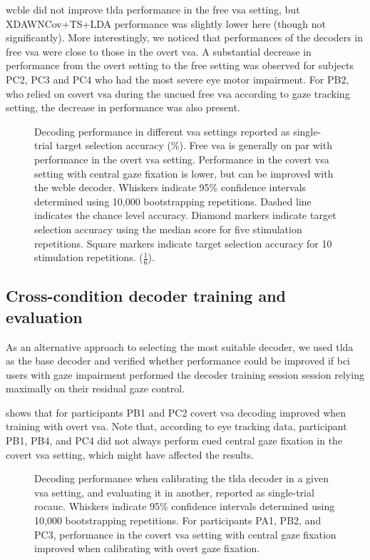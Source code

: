 \documentclass[twocolumn]{article}
\begin{document}
\Ac{wcble} did not improve \ac{tlda} performance in the free \ac{vsa} setting, but
XDAWNCov+TS+LDA performance was slightly lower here (though not
significantly).
More interestingly, we noticed that performances of the decoders in free
\ac{vsa} were close to those in the overt \ac{vsa}.
A substantial decrease in performance from the overt setting to the free
setting was observed for subjects PC2, PC3 and PC4 who had the most severe eye
motor impairment.
For PB2, who relied on covert \ac{vsa} during the uncued free \ac{vsa}
according to gaze tracking setting, the decrease in performance was also
present.
\begin{figure}[t]
	
	\caption{%
		Decoding performance in different \ac{vsa} settings reported as
		single-trial target selection accuracy (\%).
		Free \ac{vsa} is generally on par with performance in the overt \ac{vsa}
		setting.
		Performance in the covert \ac{vsa} setting with central gaze fixation is lower, but can
		be improved with the \ac{wcble} decoder.
		Whiskers indicate 95\% confidence intervals determined using 10,000 bootstrapping
		repetitions. Dashed line indicates the chance level accuracy. Diamond
		markers indicate target selection accuracy using the median score for five stimulation
		repetitions. Square markers indicate target selection accuracy for 10
		stimulation repetitions.
		($\frac{1}{6}$).
	}
	\label{fig:patients/decode}
\end{figure}

\subsection{Cross-condition decoder training and evaluation}
\label{sec:patients/outcomes/cross}

As an alternative approach to selecting the most suitable decoder, we used
\ac{tlda} as the base decoder and verified whether performance could be improved
if \ac{bci} users with gaze impairment performed the decoder training session
session relying maximally on their residual gaze control.

 shows that for participants PB1 and PC2 covert \ac{vsa} decoding
improved when training with overt \ac{vsa}.
Note that, according to eye tracking data, participant PB1, PB4, and PC4 did not
always perform cued central gaze fixation in the covert \ac{vsa} setting,
which might have affected the results.
\begin{figure}[t]
	
	\caption{
		Decoding performance when calibrating the \ac{tlda} decoder in a given \ac{vsa}
		setting, and evaluating it in another, reported as
		single-trial \ac{rocauc}.
		Whiskers indicate 95\% confidence intervals determined using 10,000 bootstrapping
		repetitions.
		For participants PA1, PB2, and PC3, performance in the covert \ac{vsa} setting with central gaze fixation
		improved when calibrating with overt gaze fixation.
	}
	\label{fig:patients/cross}
\end{figure}
\end{document}

